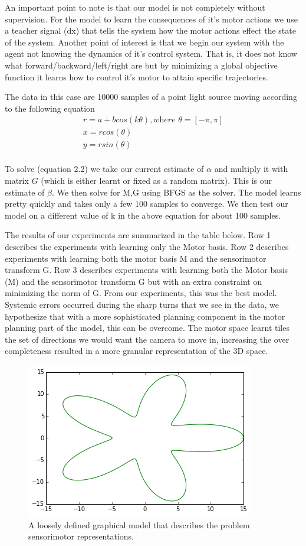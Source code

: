 \documentclass[conference]{IEEEtran}
\begin{document}
An important point to note is that our model is not completely without supervision. For the model to learn the consequences of it's motor actions we use a teacher signal (dx) that tells the system how the motor actions effect the state of the system. Another point of interest is that we begin our system with the agent not knowing the dynamics of it's control system. That is, it does not know what forward/backward/left/right are but by minimizing a global objective function it learns how to control it's motor to attain specific trajectories. 

The data in this case are 10000 samples of a point light source moving according to the following equation 
\begin{eqnarray}
r = a + b cos(k \theta),\textit{where } \theta = [ -\pi, \pi ] \\
x = r cos(\theta)\\
y = r sin(\theta)\\
\end{eqnarray}

To solve (equation 2.2) we take our current estimate of $\alpha$ and multiply it with matrix $G$ (which is either learnt or fixed as a random matrix). This is our estimate of $\beta$. We then solve for M,G using BFGS as the solver. The model learns pretty quickly and takes only a few 100 samples to converge. We then test our model on a different value of k in the above equation for about 100 samples.

The results of our experiments are summarized in the table below. Row 1 describes the experiments with learning only the Motor basis. Row 2 describes experiments with learning both the motor basis M and the sensorimotor transform G. Row 3 describes experiments with learning both the Motor basis (M) and the sensorimotor transform G but with an extra constraint on minimizing the norm of G. From our experiments, this was the best model. Systemic errors occurred during the sharp turns that we see in the data, we hypothesize that with a more sophisticated planning component in the motor planning part of the model, this can be overcome. The motor space learnt tiles the set of directions we would want the camera to move in, increasing the over completeness resulted in a more granular representation of the 3D space.

\begin{figure}
\includegraphics[scale=0.6]{train1.png}
\caption{A loosely defined graphical model that describes the problem sensorimotor representations. }
\end{figure}
\end{document}
